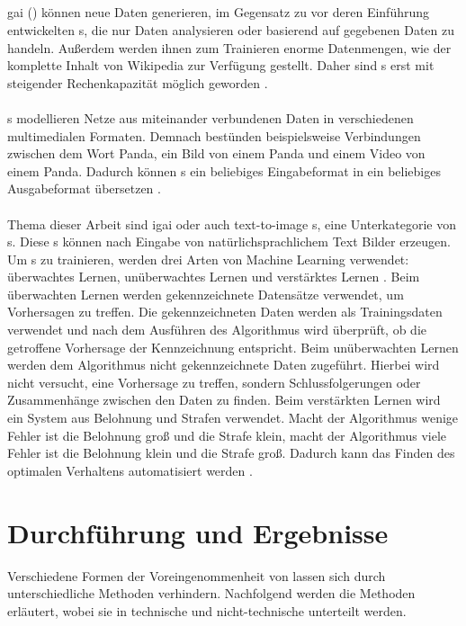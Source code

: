 \documentclass[hidelinks,12pt]{report}
\begin{document}
\section{}\label{def_ki}
\gls{gai} () können neue Daten generieren, im Gegensatz zu vor deren Einführung entwickelten s, die nur Daten analysieren oder basierend auf gegebenen Daten zu handeln. Außerdem werden ihnen zum Trainieren enorme Datenmengen, wie der komplette Inhalt von Wikipedia zur Verfügung gestellt. Daher sind s erst mit steigender Rechenkapazität möglich geworden \cite{Roberto}. 
\\\\
s modellieren Netze aus miteinander verbundenen Daten in verschiedenen multimedialen Formaten. Demnach bestünden beispielsweise Verbindungen zwischen dem Wort Panda, ein Bild von einem Panda und einem Video von einem Panda. Dadurch können s ein beliebiges Eingabeformat in ein beliebiges Ausgabeformat übersetzen \cite{Roberto}. 
\\\\
Thema dieser Arbeit sind \gls{igai} oder auch text-to-image s, eine Unterkategorie von s. Diese s können nach Eingabe von natürlichsprachlichem Text Bilder erzeugen. Um  s zu trainieren, werden drei Arten von Machine Learning verwendet: überwachtes Lernen, unüberwachtes Lernen und verstärktes Lernen \cite{Roberto}. Beim überwachten Lernen werden gekennzeichnete Datensätze verwendet, um Vorhersagen zu treffen. Die gekennzeichneten Daten werden als Trainingsdaten verwendet und nach dem Ausführen des Algorithmus wird überprüft, ob die getroffene Vorhersage der Kennzeichnung entspricht. Beim unüberwachten Lernen werden dem Algorithmus nicht gekennzeichnete Daten zugeführt. Hierbei wird nicht versucht, eine Vorhersage zu treffen, sondern Schlussfolgerungen oder Zusammenhänge zwischen den Daten zu finden. Beim verstärkten Lernen wird ein System aus Belohnung und Strafen verwendet. Macht der Algorithmus wenige Fehler ist die Belohnung groß und die Strafe klein, macht der Algorithmus viele Fehler ist die Belohnung klein und die Strafe groß. Dadurch kann das Finden des optimalen Verhaltens automatisiert werden \cite{serafeim}.






\chapter{Durchführung und Ergebnisse}\label{execution}
Verschiedene Formen der Voreingenommenheit von  lassen sich durch unterschiedliche Methoden verhindern. Nachfolgend werden die Methoden erläutert, wobei sie in technische und nicht-technische unterteilt werden.
\end{document}
